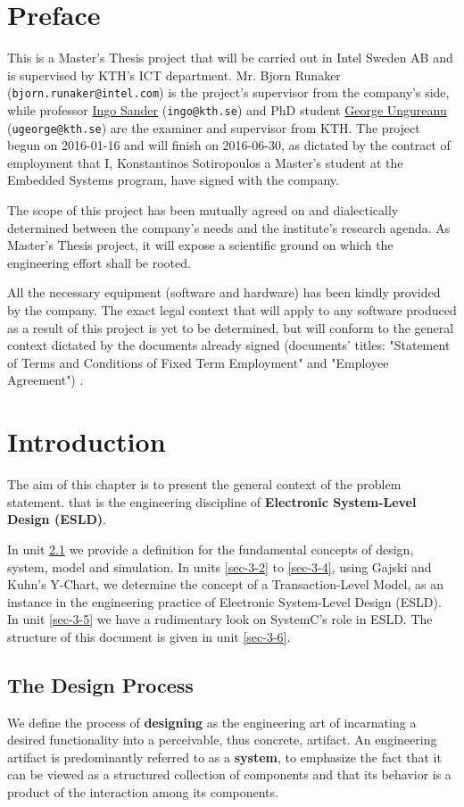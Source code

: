 \documentclass[12pt,twoside]{article}
\begin{document}
\section{Preface}
\label{sec-2}
This is a Master's Thesis project that will be carried out in Intel Sweden AB and is supervised by KTH's ICT department.
Mr. Bjorn Runaker (\texttt{bjorn.runaker@intel.com}) is the project's supervisor from the company's side, 
while professor \href{https://people.kth.se/~ingo/}{Ingo Sander} (\texttt{ingo@kth.se}) and PhD student \href{http://people.kth.se/~ugeorge/}{George Ungureanu} (\texttt{ugeorge@kth.se}) are the examiner and supervisor from KTH. 
The project begun on 2016-01-16 and will finish on 2016-06-30, as dictated by the contract of employment that I, Konstantinos Sotiropoulos a Master's student at the Embedded Systems program, have signed with the company.

The scope of this project has been mutually agreed on and dialectically determined between the company's needs and the institute's research agenda.
As Master's Thesis project, it will expose a scientific ground on which the engineering effort shall be rooted.

All the necessary equipment (software and hardware) has been kindly provided by the company.
The exact legal context that will apply to any software produced as a result of this project is yet to be determined, 
but will conform to the general context dictated by the documents already signed (documents' titles:  "Statement of Terms and Conditions of Fixed Term Employment" and "Employee Agreement") .
\clearpage


\section{Introduction}
\label{sec-3}
The aim of this chapter is to present the general context of the problem statement.
that is the engineering discipline of \textbf{Electronic System-Level Design (ESLD)}.

In unit \ref{sec-3-1} we provide a definition for the fundamental concepts of design, system, model and simulation.
In units \ref{sec-3-2} to \ref{sec-3-4}, using Gajski and Kuhn's Y-Chart, we determine the concept of a Transaction-Level Model, as an instance in the engineering practice of Electronic System-Level Design (ESLD).
In unit \ref{sec-3-5} we have a rudimentary look on SystemC's role in ESLD.
The structure of this document is given in unit \ref{sec-3-6}.

\subsection{The Design Process}
\label{sec-3-1}
We define the process of \textbf{designing} as the engineering art of incarnating a desired functionality into a perceivable, thus concrete, artifact.
An engineering artifact is predominantly referred to as a \textbf{system}, 
to emphasize the fact that it can be viewed as a structured collection of components and that its behavior is a product of the interaction among its components.
\end{document}
